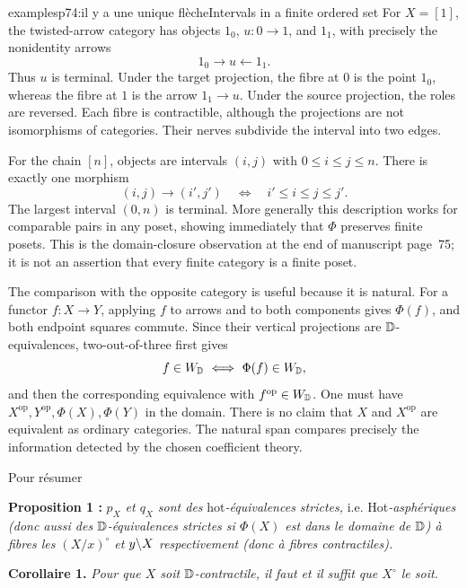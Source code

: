 \begin{dcomment}{examples}{p74:il y a une unique flèche}{Intervals in a finite ordered set}
For $X=[1]$, the twisted-arrow category has objects $1_0$, $u:0\to1$, and $1_1$, with precisely the nonidentity arrows
\[
 1_0\longrightarrow u\longleftarrow1_1.
\]
Thus $u$ is terminal. Under the target projection, the fibre at $0$ is the point $1_0$, whereas the fibre at $1$ is the arrow $1_1\to u$. Under the source projection, the roles are reversed. Each fibre is contractible, although the projections are not isomorphisms of categories. Their nerves subdivide the interval into two edges.

For the chain $[n]$, objects are intervals $(i,j)$ with $0\leq i\leq j\leq n$. There is exactly one morphism
\[
 (i,j)\longrightarrow(i',j')
 \quad\Longleftrightarrow\quad i'\leq i\leq j\leq j'.
\]
The largest interval $(0,n)$ is terminal. More generally this description works for comparable pairs in any poset, showing immediately that $\Phi$ preserves finite posets. This is the domain-closure observation at the end of manuscript page~75; it is not an assertion that every finite category is a finite poset.

The comparison with the opposite category is useful because it is natural. For a functor $f:X\to Y$, applying $f$ to arrows and to both components gives $\Phi(f)$, and both endpoint squares commute. Since their vertical projections are $\mathbb{D}$-equivalences, two-out-of-three first gives
\[
 f\in W_{\D}\ \Longleftrightarrow\ \Phi(f)\in W_{\D},
\]
and then the corresponding equivalence with $f^{\mathrm{op}}\in W_{\mathbb{D}}$. One must have $X^{\mathrm{op}},Y^{\mathrm{op}},\Phi(X),\Phi(Y)$ in the domain. There is no claim that $X$ and $X^{\mathrm{op}}$ are equivalent as ordinary categories. The natural span compares precisely the information detected by the chosen coefficient theory.
\end{dcomment}



Pour résumer

\textbf{Proposition 1 :} \textit{$p_X$ et $q_X$ sont des} \textsf{hot}\textit{-équivalences strictes,} i.e. \textsf{Hot}\textit{-asphériques (donc aussi des $\mathbb{D}$-équivalences strictes si $\Phi(X)$ est dans le domaine de $\mathbb{D}$) à fibres les $(X/x)^\circ$ et $y\backslash X$ respectivement (donc à fibres contractiles).}

\textbf{Corollaire 1.} \textit{Pour que $X$ soit $\mathbb{D}$-contractile, il faut et il suffit que $X^\circ$ le soit.}

